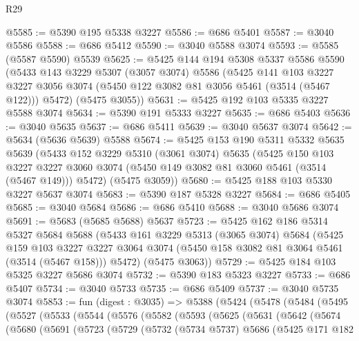 \begin{lexlean}{R29}
\begin{coremodule}
@5585 := @5390 @195 @5338 @3227
@5586 := @686 @5401
@5587 := @3040 @5586
@5588 := @686 @5412
@5590 := @3040 @5588 @3074
@5593 := @5585 (@5587 @5590) @5539
@5625 := @5425
    @144
    @194
    @5308
    @5337
    @5586
    @5590
    (@5433
      @143
      @3229
      @5307
      (@3057 @3074)
      @5586
      (@5425
        @141
        @103
        @3227
        @3227
        @3056
        @3074
        (@5450 @122 @3082 @81 @3056 @5461 (@3514 (@5467 @122)))
        @5472)
      (@5475 @3055))
@5631 := @5425 @192 @103 @5335 @3227 @5588 @3074
@5634 := @5390 @191 @5333 @3227
@5635 := @686 @5403
@5636 := @3040 @5635
@5637 := @686 @5411
@5639 := @3040 @5637 @3074
@5642 := @5634 (@5636 @5639) @5588
@5674 := @5425
    @153
    @190
    @5311
    @5332
    @5635
    @5639
    (@5433
      @152
      @3229
      @5310
      (@3061 @3074)
      @5635
      (@5425
        @150
        @103
        @3227
        @3227
        @3060
        @3074
        (@5450 @149 @3082 @81 @3060 @5461 (@3514 (@5467 @149)))
        @5472)
      (@5475 @3059))
@5680 := @5425 @188 @103 @5330 @3227 @5637 @3074
@5683 := @5390 @187 @5328 @3227
@5684 := @686 @5405
@5685 := @3040 @5684
@5686 := @686 @5410
@5688 := @3040 @5686 @3074
@5691 := @5683 (@5685 @5688) @5637
@5723 := @5425
    @162
    @186
    @5314
    @5327
    @5684
    @5688
    (@5433
      @161
      @3229
      @5313
      (@3065 @3074)
      @5684
      (@5425
        @159
        @103
        @3227
        @3227
        @3064
        @3074
        (@5450 @158 @3082 @81 @3064 @5461 (@3514 (@5467 @158)))
        @5472)
      (@5475 @3063))
@5729 := @5425 @184 @103 @5325 @3227 @5686 @3074
@5732 := @5390 @183 @5323 @3227
@5733 := @686 @5407
@5734 := @3040 @5733
@5735 := @686 @5409
@5737 := @3040 @5735 @3074
@5853 := fun (digest : @3035) =>
  @5388
    (@5424
      (@5478
        (@5484
          (@5495
            (@5527
              (@5533
                (@5544
                  (@5576
                    (@5582
                      (@5593
                        (@5625
                          (@5631
                            (@5642
                              (@5674
                                (@5680
                                  (@5691
                                    (@5723
                                      (@5729
                                        (@5732
                                          (@5734 @5737)
                                          @5686
                                          (@5425
                                            @171
                                            @182

\end{coremodule}
\end{lexlean}
